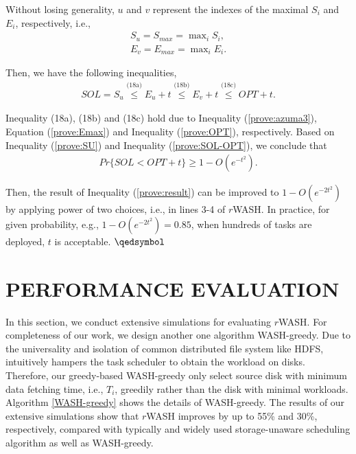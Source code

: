 \documentclass[conference]{IEEEtran}
\begin{document}
\vspace{-0.2cm}
Without losing generality, $u$ and $v$ represent the indexes of the maximal $S_i$ and $E_i$, respectively, i.e.,
\vspace{-0.2cm}
\begin{align}
	S_u = S_{max} = \max\nolimits_i S_i,\\
	E_v = E_{max} = \max\nolimits_i E_i.\label{prove:Emax}
\end{align}

\vspace{-0.2cm}
Then, we have the following inequalities,
\vspace{-0.2cm}
\begin{align}
SOL = S_u  
\overset{\text{(18a)}}{\leq} E_u+t
\overset{\text{(18b)}}{\leq} E_v+t
\overset{\text{(18c)}}{\leq} OPT+t.\label{prove:SOL-OPT}
\end{align}

Inequality (18a), (18b) and (18c) hold due to Inequality (\ref{prove:azuma3}), Equation (\ref{prove:Emax}) and Inequality (\ref{prove:OPT}), respectively.  Based on Inequality (\ref{prove:SU}) and Inequality (\ref{prove:SOL-OPT}), we conclude that
\vspace{-0.1cm}
\begin{align}
Pr\{SOL<OPT+t\}\geq 1 - O(e^{-t^2}).\label{prove:result}
\end{align}

\vspace{-0.2cm}

Then, the result of Inequality (\ref{prove:result}) can be improved to $1 - O(e^{-2t^2})$ by applying power of two choices, i.e., in lines 3-4 of $r$WASH. In practice, for given probability, e.g., $1 - O(e^{-2t^2}) = 0.85$, when hundreds of tasks are deployed, $t$ is acceptable. \hfill \;$\qedsymbol$



\section{PERFORMANCE EVALUATION}\label{PERFORMANCE_EVALUATION}
In this section, we conduct extensive simulations for evaluating $r$WASH. 
For completeness of our work, we design another one algorithm WASH-greedy. Due to the universality and isolation of common distributed file system like HDFS, intuitively hampers the task scheduler to obtain the workload on disks. Therefore, our greedy-based WASH-greedy only select source disk with minimum data fetching time, i.e., $T_i$, greedily rather than the disk with minimal workloads. 
Algorithm \ref{WASH-greedy} shows the details of WASH-greedy. 
The results of our extensive simulations show that $r$WASH improves by up to 55\% and 30\%, respectively, compared with typically and widely used storage-unaware scheduling algorithm as well as WASH-greedy. 
\end{document}
